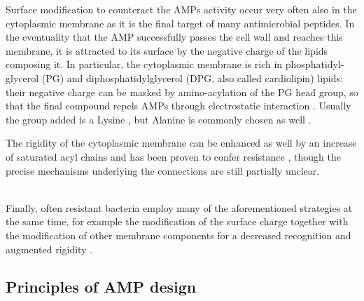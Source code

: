 Surface modification to counteract the AMPs activity occur very often also in the cytoplasmic membrane as it is the final target of many antimicrobial peptides. In the eventuality that the AMP successfully passes the cell wall and reaches this membrane, it is attracted to its surface by the negative charge of the lipids composing it. In particular, the cytoplasmic membrane is rich in phosphatidyl-glycerol (PG) and diphosphatidylglycerol (DPG, also called cardiolipin) lipids: their negative charge can be masked by amino-acylation of the PG head group, so that the final compound repels AMPs through electrostatic interaction \cite{Peschel2001}. Usually the group added is a Lysine \cite{Thedieck2006}, but Alanine is commonly chosen as well \cite{Klein2009}.

The rigidity of the cytoplasmic membrane can be enhanced as well by an increase of saturated acyl chains and has been proven to confer resistance \cite{Band2014,Kumariya2015}, though the precise mechanisms underlying the connections are still partially unclear.

\hspace{0.5cm}
\\
Finally, often resistant bacteria employ many of the aforementioned strategies at the same time, for example the modification of the surface charge together with the modification of other membrane components for a decreased recognition and augmented rigidity \cite{Raetz2007}.


\subsection{Principles of AMP design} \label{sec:amp_design}

